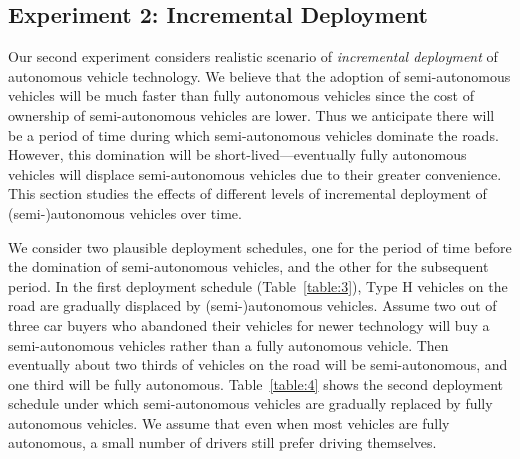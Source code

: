 




\subsection{Experiment 2: Incremental Deployment}

Our second experiment considers realistic scenario of
\emph{incremental deployment} of autonomous vehicle technology.  We
believe that the adoption of semi-autonomous vehicles will be much
faster than fully autonomous vehicles since the cost of ownership of
semi-autonomous vehicles are lower.  Thus we anticipate there will be
a period of time during which semi-autonomous vehicles dominate the roads.
However, this domination will be short-lived---eventually fully autonomous
vehicles will displace semi-autonomous vehicles due to their greater
 convenience.  This section studies the
effects of different levels of incremental deployment of
(semi-)autonomous vehicles over time.

We consider two plausible deployment schedules, one for the period of
time before the domination of semi-autonomous vehicles, and the other
for the subsequent period.  In the first deployment schedule
(Table~\ref{table:3}), Type H vehicles on the road are gradually
displaced by (semi-)autonomous vehicles.  Assume two out of three car
buyers who abandoned their vehicles for newer technology will buy a
semi-autonomous vehicles rather than a fully autonomous vehicle.  Then
eventually about two thirds of vehicles on the road will be
semi-autonomous, and one third will be fully autonomous.
Table~\ref{table:4} shows the second deployment schedule under which
semi-autonomous vehicles are gradually replaced by fully autonomous
vehicles. We assume that even when most vehicles are fully autonomous,
a small number of drivers still prefer driving themselves.

